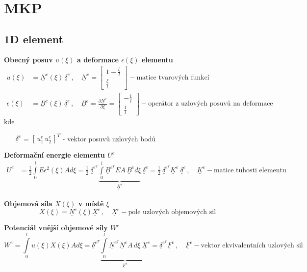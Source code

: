 \documentclass[10pt,oneside]{article}
\newcommand{\ul}[1]{\underline{#1}}
\newcommand{\ull}[1]{\underline{\underline{#1}}}
\begin{document}
\newpage
\section*{MKP}
%
\subsection*{1D element}
\textbf{Obecný posuv $u(\xi)$ a deformace $\epsilon(\xi)$ elementu}
\begin{align*}
	u(\xi) &= \ul{N}^e\!(\xi)\, \ul{\delta}^e
	\,,\quad \ul{N}^e = \begin{bmatrix} 1-\frac{\xi}{l} \\ \frac{\xi}{l} \end{bmatrix} - \text{matice tvarových funkcí} \\
	\epsilon(\xi) &= \ul{B}^e\!(\xi)\, \ul{\delta}^e
	\,,\quad \ul{B}^e = \frac{\partial \ul{N}^e}{\partial \xi} = \begin{bmatrix} -\frac{1}{l} \\ \frac{1}{l} \end{bmatrix} - \text{operátor z uzlových posuvů na deformace}
\end{align*}
kde
\begin{itemize}
	\item [$\ul{\delta}^e$] = $[\, u_1^e \, u_2^e \,]^T$ - vektor posuvů uzlových bodů
\end{itemize}

\textbf{Deformační energie elementu $U^e$}
\begin{align*}
	U^e &= \frac{1}{2} \int\limits_0^l E \epsilon^2(\xi) A d\xi
		= \frac{1}{2}\ \ul{\delta}^{e^T} \underbrace{\int\limits_0^l \ul{B}^{e^T}\!E A\,\ul{B}^e d\xi}_{\ull{K}^e}\ \ul{\delta}^e
		= \frac{1}{2}\ \ul{\delta}^{e^T}\!\ull{K}^e\ \ul{\delta}^e
		\,,\quad
		\ull{K}^e - \text{matice tuhosti elementu}
\end{align*}

\textbf{Objemová síla $X(\xi)$ v místě $\xi$}
\begin{equation*}
	X(\xi) = \ul{N}^e\!(\xi) \ul{X}^e
	\,,\quad \ul{X}^e - \text{pole uzlových objemových sil}
\end{equation*}

\textbf{Potenciál vnější objemové síly $W^e$}
\begin{equation*}
	W^e = \int\limits_0^l u(\xi) X(\xi) A d\xi
		= \ul{\delta}^{e^T} \underbrace{\int\limits_0^l \ul{N}^{e^T} \ul{N}^e A\,d\xi\ \ul{X}^e}_{\ul{F}^e}
		= \ul{\delta}^{e^T} \ul{F}^e
		\,,\quad
		\ul{F}^e - \text{vektor ekvivalentních uzlových sil}
\end{equation*}
\end{document}
